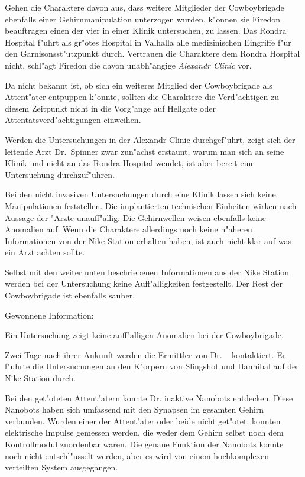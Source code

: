 
Gehen die Charaktere davon aus, dass weitere Mitglieder der Cowboybrigade ebenfalls einer Gehirnmanipulation unterzogen wurden, k"onnen sie Firedon beauftragen einen der vier in einer Klinik untersuchen, zu lassen. Das Rondra Hospital f"uhrt als gr"o\3tes Hospital in Valhalla alle medizinischen Eingriffe f"ur den Garnisonsst"utzpunkt durch. Vertrauen die Charaktere dem Rondra Hospital nicht, schl"agt Firedon die davon unabh"angige \emph{Alexandr Clinic} vor. 

Da nicht bekannt ist, ob sich ein weiteres Mitglied der Cowboybrigade als Attent"ater entpuppen k"onnte, sollten die Charaktere die Verd"achtigen zu diesem Zeitpunkt nicht in die Vorg"ange auf Hellgate oder Attentatsverd"achtigungen einweihen.

Werden die Untersuchungen in der Alexandr Clinic durchgef"uhrt, zeigt sich der leitende Arzt Dr.~Spinner zwar zun"achst erstaunt, warum man sich an seine Klinik und nicht an das Rondra Hospital wendet, ist aber bereit eine Untersuchung durchzuf"uhren. 

Bei den nicht invasiven Untersuchungen durch eine Klinik lassen sich keine Manipulationen feststellen. Die implantierten technischen Einheiten wirken nach Aussage der "Arzte unauff"allig. Die Gehirnwellen weisen ebenfalls keine Anomalien auf. Wenn die Charaktere allerdings noch keine n"aheren Informationen von der Nike Station erhalten haben, ist auch nicht klar auf was ein Arzt achten sollte. 

Selbst mit den weiter unten beschriebenen Informationen aus der Nike Station werden bei der Untersuchung keine Auff"alligkeiten festgestellt. Der Rest der Cowboybrigade ist ebenfalls sauber.

\begin{remarks}
	Gewonnene Information: 
	
	Ein Untersuchung zeigt keine auff"alligen Anomalien bei der Cowboybrigade.	
\end{remarks}


Zwei Tage nach ihrer Ankunft werden die Ermittler von Dr. ~  kontaktiert.  Er f"uhrte die Untersuchungen an den K"orpern von Slingshot und Hannibal auf der Nike Station durch.

Bei den get"oteten Attent"atern konnte Dr.   inaktive Nanobots entdecken. Diese Nanobots haben sich umfassend mit den Synapsen im gesamten Gehirn verbunden. Wurden einer der Attent"ater oder beide nicht get"otet, konnten elektrische Impulse gemessen werden, die weder dem Gehirn selbst noch dem Kontrollmodul zuordenbar waren. Die genaue Funktion der Nanobots konnte noch nicht entschl"usselt werden, aber es wird von einem hochkomplexen verteilten System ausgegangen.

